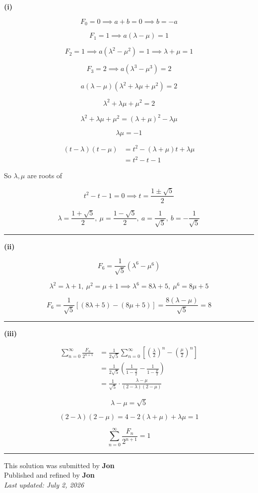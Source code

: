 \documentclass[12pt]{article}
\begin{document}
\newcommand{\ds}{\displaystyle}
\textbf{(i)}


$$F_0=0\implies a+b=0\implies b=-a$$

$$F_1=1\implies a(\lambda-\mu)=1$$

$$F_2=1\implies a(\lambda^2-\mu^2)=1\implies \lambda+\mu=1$$

$$F_3=2\implies a(\lambda^3-\mu^3)=2$$

$$a(\lambda-\mu)(\lambda^2+\lambda\mu+\mu^2)=2$$

$$\lambda^2+\lambda\mu+\mu^2=2$$

$$\lambda^2+\lambda\mu+\mu^2=(\lambda+\mu)^2-\lambda\mu$$

$$\lambda\mu=-1$$

\begin{align*}
(t-\lambda)(t-\mu)
&=t^2-(\lambda+\mu)t+\lambda\mu\\
&=t^2-t-1
\end{align*}

So $\lambda,\mu$ are roots of

$$t^2-t-1=0\implies t=\frac{1\pm\sqrt5}{2}$$

$$\lambda=\frac{1+\sqrt5}{2},\  \mu=\frac{1-\sqrt5}{2},\ a=\frac1{\sqrt5},\  b=-\frac1{\sqrt5}$$

\bigskip\hrule\bigskip

\textbf{(ii)}

$$F_6=\frac1{\sqrt5}\left(\lambda^6-\mu^6\right)$$

$$\lambda^2=\lambda+1,\ \mu^2=\mu+1\implies\lambda^6=8\lambda+5,\  \mu^6=8\mu+5$$

$$F_6=\frac1{\sqrt5}\left[(8\lambda+5)-(8\mu+5)\right]=\frac{8(\lambda-\mu)}{\sqrt5}=8$$

\bigskip\hrule\bigskip

\textbf{(iii)}

\begin{align*}
\sum_{n=0}^{\infty}\frac{F_n}{2^{n+1}}
&=\frac1{2\sqrt5}\sum_{n=0}^{\infty}\left[\left(\frac{\lambda}{2}\right)^n-\left(\frac{\mu}{2}\right)^n\right]\\
&=\frac1{2\sqrt5}\left(\frac1{1-\frac{\lambda}{2}}-\frac1{1-\frac{\mu}{2}}\right)\\
&=\frac1{\sqrt5}\cdot\frac{\lambda-\mu}{(2-\lambda)(2-\mu)}
\end{align*}

$$\lambda-\mu=\sqrt5$$

$$(2-\lambda)(2-\mu)=4-2(\lambda+\mu)+\lambda\mu=1$$

$$\sum_{n=0}^{\infty}\frac{F_n}{2^{n+1}}=1$$

\bigskip
\hrule
\begin{center}
    This solution was submitted by \textbf{Jon}\\[4pt]
    Published and refined by \textbf{Jon}\\[8pt]
    \textit{Last updated: July 2, 2026}
\end{center}
\end{document}
